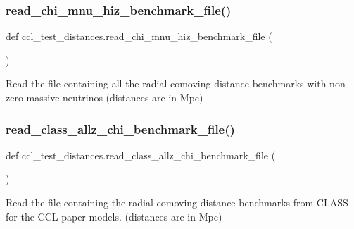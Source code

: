 \subsubsection{\texorpdfstring{read\+\_\+chi\+\_\+mnu\+\_\+hiz\+\_\+benchmark\+\_\+file()}{read\_chi\_mnu\_hiz\_benchmark\_file()}}
{\footnotesize\ttfamily def ccl\+\_\+test\+\_\+distances.\+read\+\_\+chi\+\_\+mnu\+\_\+hiz\+\_\+benchmark\+\_\+file (\begin{DoxyParamCaption}{ }\end{DoxyParamCaption})}

\begin{DoxyVerb}Read the file containing all the radial comoving distance benchmarks
with non-zero massive neutrinos
(distances are in Mpc)
\end{DoxyVerb}
 \mbox{\label{namespaceccl__test__distances_a566ae859d5f0e8fb3179c594234d7100}} 
\subsubsection{\texorpdfstring{read\+\_\+class\+\_\+allz\+\_\+chi\+\_\+benchmark\+\_\+file()}{read\_class\_allz\_chi\_benchmark\_file()}}
{\footnotesize\ttfamily def ccl\+\_\+test\+\_\+distances.\+read\+\_\+class\+\_\+allz\+\_\+chi\+\_\+benchmark\+\_\+file (\begin{DoxyParamCaption}{ }\end{DoxyParamCaption})}

\begin{DoxyVerb}Read the file containing the radial comoving distance benchmarks from
CLASS for the CCL paper models. (distances are in Mpc)
\end{DoxyVerb}
 \mbox{\label{namespaceccl__test__distances_a15d6c0001cdf1c1387ba93eaa5303ffe}} 

